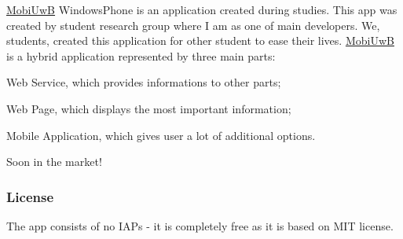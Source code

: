 \hyperlink{a00264}{Mobi\+Uw\+B} Windows\+Phone is an application created during studies. This app was created by student research group where I am as one of main developers. We, students, created this application for other student to ease their lives. \hyperlink{a00264}{Mobi\+Uw\+B} is a hybrid application represented by three main parts\+:
\begin{DoxyItemize}
\item Web Service, which provides informations to other parts;
\item Web Page, which displays the most important information;
\item Mobile Application, which gives user a lot of additional options.
\end{DoxyItemize}

Soon in the market!

\subsubsection*{License}

The app consists of no I\+A\+P\textquotesingle{}s -\/ it is completely free as it is based on M\+I\+T license. 